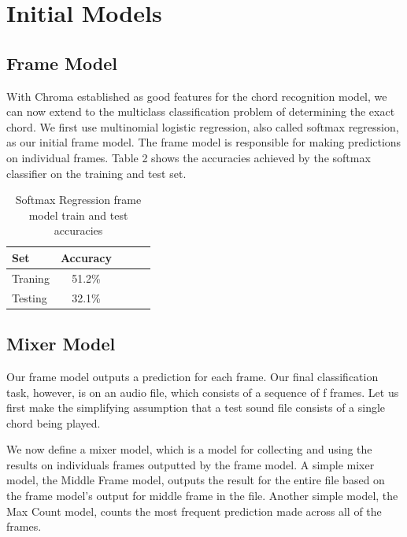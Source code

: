 \documentclass{article}
\begin{document}
\section{Initial Models}
\subsection{Frame Model}
With Chroma established as good features for the chord recognition model, we can
now extend to the multiclass classification problem of determining the exact
chord. We first use multinomial logistic regression, also called softmax
regression, as our initial frame model. The frame model is responsible for
making predictions on individual frames. Table 2 shows the accuracies achieved
by the softmax classifier on the training and test set.
\begin{table}[t]
\caption{Softmax Regression frame model train and test accuracies}
\label{softmax}
\vskip 0.15in
\begin{center}
\begin{small}
\begin{sc}
\begin{tabular}{lcccr}
\hline
\abovespace\belowspace
Set & Accuracy \\
\hline
\abovespace
Traning & 51.2\%\\
Testing & 32.1\%\\
\hline
\end{tabular}
\end{sc}
\end{small}
\end{center}
\vskip -0.1in
\end{table}

\subsection{Mixer Model}
Our frame model outputs a prediction for each frame. Our final classification
task, however, is on an audio file, which consists of a sequence of f frames.
Let us first make the simplifying assumption that a test sound file consists of
a single chord being played.

We now define a mixer model, which is a model for collecting and using the
results on individuals frames outputted by the frame model. A simple mixer
model, the Middle Frame model, outputs the result for the entire file based on
the frame model's output for middle frame in the file. Another simple model, the
Max Count model, counts the most frequent prediction made across all of the
frames.
\end{document}
